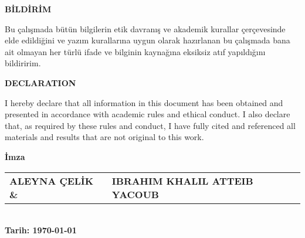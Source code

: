 \begin{center}
\textbf{BİLDİRİM}
\end{center}
\begin{singlespace}%
Bu çalışmada bütün bilgilerin etik davranış ve akademik kurallar çerçevesinde elde edildiğini ve yazım kurallarına uygun olarak hazırlanan bu çalışmada bana ait olmayan her türlü ifade ve bilginin kaynağına eksiksiz atıf yapıldığını bildiririm.
\end{singlespace}
\vspace{2cm}

\begin{center}
\textbf{DECLARATION}
\end{center}
\begin{singlespace}
I hereby declare that all information in this document has been obtained and presented in accordance with academic rules and ethical conduct. I also declare that, as required by these rules and conduct, I have fully cited and referenced all materials and results that are not original to this work.
\end{singlespace}

\vspace{3cm}
\begin{flushright}
    \begin{minipage}{10cm}
        \begin{center}
            \textbf{İmza} \\[2ex]
            \begin{tabular}{@{}ll}
                \textbf{ALEYNA ÇELİK \&} & \textbf{IBRAHIM KHALIL ATTEIB YACOUB} \\
            \end{tabular} \\[2ex]
            \textbf{Tarih: \today}\hfill
        \end{center}
    \end{minipage}
\end{flushright}

